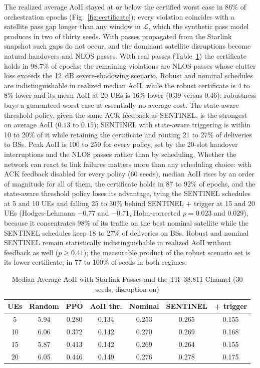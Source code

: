 The realized average AoII stayed at or below the certified worst case in 86\% of orchestration epochs
(Fig.~\ref{fig:certificate}); every violation coincides with a satellite pass gap longer than any window in
$\mathscr{L}$, which the synthetic pass model produces in two of thirty seeds. With passes propagated from the Starlink
snapshot such gaps do not occur, and the dominant satellite disruptions become natural handovers and NLOS passes.
With real passes (Table~\ref{tab:tle}) the certificate holds in 98.7\% of epochs; the remaining violations are
NLOS passes whose clutter loss exceeds the 12~dB severe-shadowing scenario. Robust and nominal schedules are
indistinguishable in realized median AoII, while the robust certificate is 4 to 8\% lower and its mean AoII at 20 UEs
is 16\% lower ($0.39$ versus $0.46$): robustness buys a guaranteed worst case at essentially no average cost. The
state-aware threshold policy, given the same ACK feedback as SENTINEL, is the strongest on average AoII ($0.13$ to
$0.15$); SENTINEL with state-aware triggering is within 10 to 20\% of it while retaining the certificate and routing
21 to 27\% of deliveries to BSs. Peak AoII is 100 to 250 for every policy, set by the 20-slot handover interruptions
and the NLOS passes rather than by scheduling. Whether the network can react to link failures matters more than
any scheduling choice: with ACK feedback disabled for every policy (60 seeds), median AoII rises by an order of
magnitude for all of them, the certificate holds in 87 to 92\% of epochs, and the state-aware threshold policy loses
its advantage, tying the SENTINEL schedules at 5 and 10 UEs and falling 25 to 30\% behind SENTINEL + trigger at 15
and 20 UEs (Hodges-Lehmann $-0.77$ and $-0.71$, Holm-corrected $p=0.023$ and $0.029$), because it concentrates 98\%
of its traffic on the best nominal satellite while the SENTINEL schedules keep 18 to 27\% of deliveries on BSs.
Robust and nominal SENTINEL remain statistically indistinguishable in realized AoII without feedback as well
($p\ge0.41$); the measurable product of the robust scenario set is its lower certificate, in 77 to 100\% of seeds
in both regimes.
\begin{table}[!t]
\centering
\caption{Median Average AoII with Starlink Passes and the TR~38.811 Channel (30 seeds, disruption on)}
\label{tab:tle}
\footnotesize
\begin{tabular}{|c|c|c|c|c|c|c|}
\hline
\textbf{UEs} & \textbf{Random} & \textbf{PPO} & \textbf{AoII thr.} & \textbf{Nominal} & \textbf{SENTINEL} & \textbf{+ trigger} \\
\hline
5 & 5.94 & 0.280 & 0.134 & 0.253 & 0.265 & 0.155 \\
10 & 6.06 & 0.372 & 0.142 & 0.270 & 0.269 & 0.168 \\
15 & 5.87 & 0.413 & 0.142 & 0.269 & 0.264 & 0.155 \\
20 & 6.05 & 0.446 & 0.149 & 0.276 & 0.278 & 0.175 \\
\hline
\end{tabular}
\end{table}
